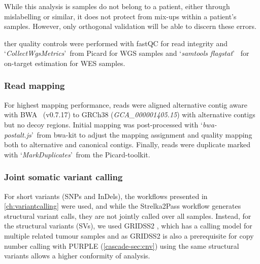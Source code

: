 While this analysis is  samples  do not belong to a patient, either through mislabelling or similar, it does not protect from mix-ups within a patient's samples. However, only orthogonal validation will be able to discern these errors.

ther quality controls were performed with fastQC \cite{Andrews2010} for read integrity and \lq\emph{CollectWgsMetrics}\rq~from Picard \cite{Picard2018} for WGS samples and \lq\emph{samtools flagstat}\rq~\cite{Danecek2021} for on-target estimation for WES samples.

\subsubsection{Read mapping}
\label{cascade-sec:mapping}
For  highest mapping performance, reads were aligned alternative contig aware with BWA~\cite{Li2013} (v0.7.17)  to GRCh38 (\emph{GCA\_000001405.15}) with alternative contigs but no decoy regions. Initial mapping was post-processed with \lq\emph{bwa-postalt.js}\rq~from bwa-kit to adjust the mapping assignment and quality mapping both to alternative and canonical contigs. Finally, reads were duplicate marked with \lq\emph{MarkDuplicates}\rq~from the Picard-toolkit.

\subsubsection{Joint somatic variant calling}
\label{cascade-sec:jsvc}
For short variants (SNPs and InDels), the workflows presented in \autoref{ch:variantcalling} were used, and while the Strelka2Pass workflow generates structural variant calls, they are not jointly called over all samples. Instead, for the structural variants (SVs), we used GRIDSS2 \cite{Cameron2021}, which has a calling model for multiple related tumour samples and as GRIDSS2 is also a prerequisite for copy number calling with PURPLE (\autoref{cascade-sec:cnv}) using the same structural variants allows a higher conformity of analysis.


